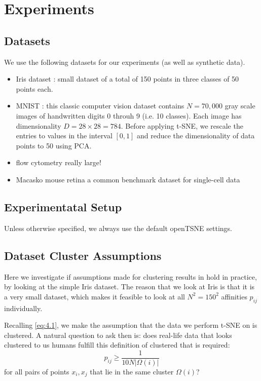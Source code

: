 \chapter{Experiments}\label{chapter:experiments}

\section{Datasets}
We use the following datasets for our experiments (as well as synthetic data). 
\begin{itemize}
    \item Iris dataset \cite{iris_dataset}: small dataset of a total of 150 points in three classes of 50 points each.
    \item MNIST \cite{mnist_dataset}: this classic computer vision dataset contains $N=70,000$ gray scale images of handwritten digits 0 throuh 9 (i.e. 10 classes). Each image has dimensionality $D=28 \times 28 = 784$. Before applying t-SNE, we rescale the entries to values in the interval $[0,1]$ and reduce the dimensionality of data points to 50 using PCA.  
    \item flow cytometry \cite{flow_dataset} really large!
    \item Macasko mouse retina \cite{Macosko_dataset} a common benchmark dataset for single-cell data
\end{itemize}

\section{Experimentatal Setup}
Unless otherwise specified, we always use the default openTSNE settings. 

\section{Dataset Cluster Assumptions}
Here we investigate if assumptions made for clustering results in \cite{LinStei22} hold in practice, by looking at the simple Iris dataset. 
The reason that we look at Iris is that it is a very small dataset, which makes it feasible to look at all $N^2 = 150^2$ affinities $p_{ij}$ individually.  

Recalling \ref{eq:4.1}, we make the assumption that the data we perform t-SNE on is clustered. 
A natural question to ask then is: does real-life data that looks clustered to us humans fulfill this definition of clustered that is required: 
\begin{equation}
    p_{ij} \geq \frac{1}{10 N |\Omega(i)|}
\end{equation}
for all pairs of points $x_i, x_j$ that lie in the same cluster $\Omega(i)$? 

